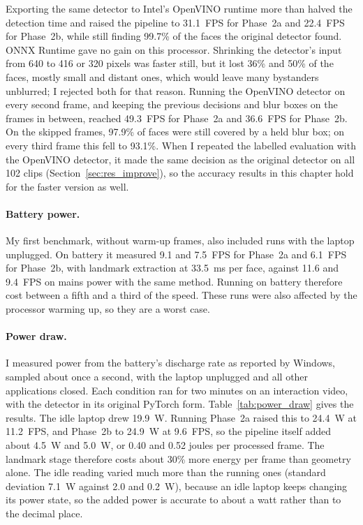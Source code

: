 Exporting the same detector to Intel's OpenVINO runtime more than halved the detection
time and raised the pipeline to 31.1~FPS for Phase~2a and 22.4~FPS for Phase~2b, while
still finding 99.7\% of the faces the original detector found. ONNX Runtime gave no gain
on this processor. Shrinking the detector's input from 640 to 416 or 320 pixels was faster
still, but it lost 36\% and 50\% of the faces, mostly small and distant ones, which would
leave many bystanders unblurred; I rejected both for that reason. Running the OpenVINO
detector on every second frame, and keeping the previous decisions and blur boxes on the
frames in between, reached 49.3~FPS for Phase~2a and 36.6~FPS for Phase~2b. On the skipped
frames, 97.9\% of faces were still covered by a held blur box; on every third frame this
fell to 93.1\%. When I repeated the labelled evaluation with the OpenVINO detector, it made the same
decision as the original detector on all 102 clips (Section~\ref{sec:res_improve}), so the
accuracy results in this chapter hold for the faster version as well.

\paragraph{Battery power.}
My first benchmark, without warm-up frames, also included runs with the laptop unplugged.
On battery it measured 9.1 and 7.5~FPS for Phase~2a and 6.1~FPS for Phase~2b, with
landmark extraction at 33.5~ms per face, against 11.6 and 9.4~FPS on mains power with the
same method. Running on battery therefore cost between a fifth and a third of the speed. These runs
were also affected by the processor warming up, so they are a worst case.

\paragraph{Power draw.}
I measured power from the battery's discharge rate as reported by Windows, sampled about
once a second, with the laptop unplugged and all other applications closed. Each condition
ran for two minutes on an interaction video, with the detector in its original PyTorch
form. Table~\ref{tab:power_draw} gives the results. The idle laptop drew 19.9~W. Running
Phase~2a raised this to 24.4~W at 11.2~FPS, and Phase~2b to 24.9~W at 9.6~FPS, so the
pipeline itself added about 4.5~W and 5.0~W, or 0.40 and 0.52 joules per processed frame.
The landmark stage therefore costs about 30\% more energy per frame than geometry alone.
The idle reading varied much more than the running ones (standard deviation 7.1~W against
2.0 and 0.2~W), because an idle laptop keeps changing its power state, so the added power
is accurate to about a watt rather than to the decimal place.

